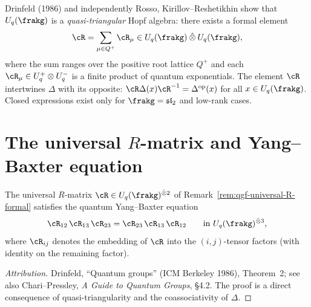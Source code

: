 \begin{remark}
\label{rem:qgf-universal-R-formal}
Drinfeld (1986) and independently Rosso, Kirillov--Reshetikhin show that $U_q(\frakg)$ is a \emph{quasi-triangular} Hopf algebra: there exists a formal element
\begin{equation}
 \cR = \sum_{\mu \in Q^+} \cR_\mu \in U_q(\frakg) \mathbin{\hat{\otimes}} U_q(\frakg),
 \label{eq:qgf-universal-R}
\end{equation}
where the sum ranges over the positive root lattice $Q^+$ and each $\cR_\mu \in U_q^+ \otimes U_q^-$ is a finite product of quantum exponentials. The element $\cR$ intertwines $\Delta$ with its opposite: $\cR \Delta(x) \cR^{-1} = \Delta^{\mathrm{op}}(x)$ for all $x \in U_q(\frakg)$. Closed expressions exist only for $\frakg = \mathfrak{sl}_2$ and low-rank cases.
\end{remark}

\section{The universal \texorpdfstring{$R$}{R}-matrix and Yang--Baxter equation}
\label{sec:qgf-r-matrix-ybe}

\begin{proposition}
\label{prop:qgf-qybe}
The universal $R$-matrix $\cR \in U_q(\frakg)^{\hat{\otimes} 2}$ of Remark~\ref{rem:qgf-universal-R-formal} satisfies the quantum Yang--Baxter equation
\begin{equation}
 \cR_{12} \, \cR_{13} \, \cR_{23} = \cR_{23} \, \cR_{13} \, \cR_{12}
 \qquad \text{in } U_q(\frakg)^{\hat{\otimes} 3},
 \label{eq:qgf-qybe}
\end{equation}
where $\cR_{ij}$ denotes the embedding of $\cR$ into the $(i, j)$-tensor factors (with identity on the remaining factor).
\end{proposition}

\begin{proof}[Attribution]
Drinfeld, ``Quantum groups'' (ICM Berkeley 1986), Theorem~2; see also Chari--Pressley, \emph{A Guide to Quantum Groups}, \S4.2. The proof is a direct consequence of quasi-triangularity and the coassociativity of $\Delta$.
\end{proof}

